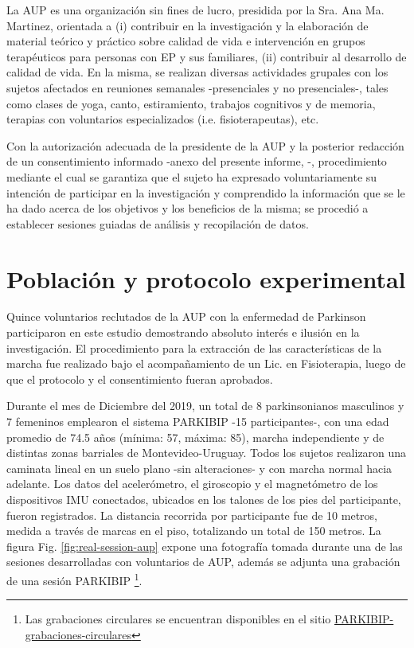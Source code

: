 La AUP es una organización sin fines de lucro, presidida por la Sra. Ana Ma. Martinez, orientada a (i) contribuir en la investigación y la elaboración de material teórico y práctico sobre calidad de vida e intervención en grupos terapéuticos para personas con EP y sus familiares, (ii) contribuir al desarrollo de calidad de vida. En la misma, se realizan diversas actividades grupales con los sujetos afectados en reuniones semanales -presenciales y no presenciales-, tales como clases de yoga, canto, estiramiento, trabajos cognitivos y de memoria, terapias con voluntarios especializados (i.e. fisioterapeutas), etc.

Con la autorización adecuada de la presidente de la AUP y la posterior redacción de un consentimiento informado -anexo del presente informe, -, procedimiento mediante el cual se garantiza que el sujeto ha expresado voluntariamente su intención de participar en la investigación y comprendido la información que se le ha dado acerca de los objetivos y los beneficios de la misma; se procedió a establecer sesiones guiadas de análisis y recopilación de datos. 

\section{Población y protocolo experimental}\label{aup:sesiones}

Quince voluntarios reclutados de la AUP con la enfermedad de Parkinson participaron en este estudio demostrando absoluto interés e ilusión en la investigación. El procedimiento  para la extracción de las características de la marcha fue realizado bajo el acompañamiento de un Lic. en Fisioterapia, luego de que el protocolo y el consentimiento fueran aprobados.

Durante el mes de Diciembre del 2019, un total de 8 parkinsonianos masculinos y 7 femeninos emplearon el sistema PARKIBIP -15 participantes-, con una edad promedio de 74.5 años (mínima: 57, máxima: 85), marcha independiente y de distintas zonas barriales de Montevideo-Uruguay. Todos los sujetos realizaron una caminata lineal en un suelo plano -sin alteraciones- y con marcha normal hacia adelante. Los datos del acelerómetro, el giroscopio y el magnetómetro de los dispositivos IMU conectados, ubicados en los talones de los pies del participante, fueron registrados. La distancia recorrida por participante fue de 10 metros, medida a través de marcas en el piso, totalizando un total de 150 metros. La figura Fig. \ref{fig:real-session-aup} expone una fotografía tomada durante una de las sesiones desarrolladas con voluntarios de AUP, además se adjunta una grabación de una sesión PARKIBIP \footnote{Las grabaciones circulares se encuentran disponibles en el sitio  \href{https://drive.google.com/drive/folders/1qmg-Nex1i13uaCr66KOUZ3LE5vgFuK2W?usp=sharing}{PARKIBIP-grabaciones-circulares}
}. 

